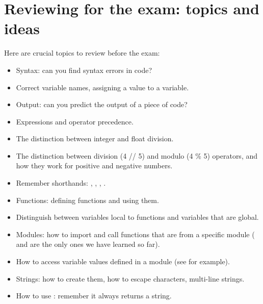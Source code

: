 \documentclass[letterpaper,10pt,english]{sphinxmanual}
\begin{document}
\section{Reviewing for the exam:  topics and ideas}
\label{\detokenize{lecture_notes/lec07_modules_images:reviewing-for-the-exam-topics-and-ideas}}
Here are crucial topics to review before the exam:
\begin{itemize}
\item {} 
Syntax: can you find syntax errors in code?

\item {} 
Correct variable names, assigning a value to a variable.

\item {} 
Output: can you predict the output of a piece of code?

\item {} 
Expressions and operator precedence.

\item {} 
The distinction between integer and float division.

\item {} 
The distinction between division (4 // 5) and modulo (4 \% 5) operators,
and how they work for positive and negative numbers.

\item {} 
Remember shorthands: \sphinxcode{\sphinxupquote{+=}}, \sphinxcode{\sphinxupquote{-=}}, \sphinxcode{\sphinxupquote{/=}}, \sphinxcode{\sphinxupquote{*=}}.

\item {} 
Functions: defining functions and using them.

\item {} 
Distinguish between variables local to functions and variables that
are global.

\item {} 
Modules: how to import and call functions that are from a specific
module ( and  are the only ones we have learned so far).

\item {} 
How to access variable values defined in a module (see 
for example).

\item {} 
Strings: how to create them, how to escape characters, multi-line strings.

\item {} 
How to use : remember it always returns a string.


\end{itemize}
\end{document}
